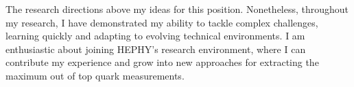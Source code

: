 \documentclass[11pt, a4paper]{awesome-cv}
\begin{document}
\begin{cvletter}

  

  The research directions above my ideas for this position. Nonetheless, throughout my research, I have demonstrated my ability to tackle complex challenges, learning quickly and adapting to evolving technical environments. I am enthusiastic about joining HEPHY's research environment, where I can contribute my experience and grow into new approaches for extracting the maximum out of top quark measurements.

\end{cvletter}

\makeletterclosing
\end{document}
